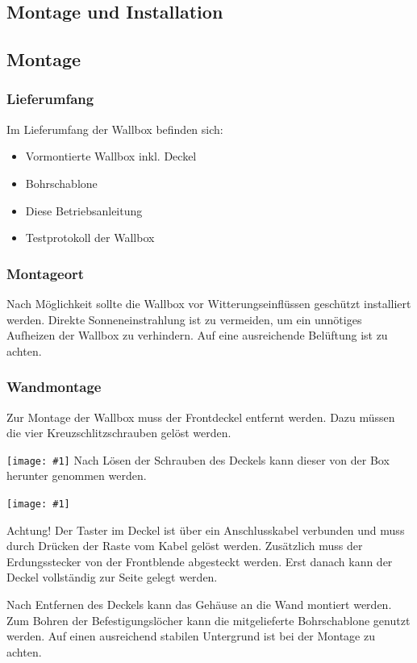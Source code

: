 \documentclass[a4paper,10pt]{article}
\newcommand{\gfx}[1]{\texttt{[image: \#1]}}
\begin{document}
\begin{multicols*}{2}
	\section{Montage und Installation}
	\subsection{Montage}
	\subsubsection{Lieferumfang}
	Im Lieferumfang der Wallbox befinden sich:
	\begin{itemize}
		\item Vormontierte Wallbox inkl. Deckel
		\item Bohrschablone
		\item Diese Betriebsanleitung
		\item Testprotokoll der Wallbox
	\end{itemize}

	\subsubsection{Montageort}
	Nach Möglichkeit sollte die Wallbox vor Witterungseinflüssen geschützt
	installiert werden. Direkte Sonneneinstrahlung ist zu vermeiden, um ein
	unnötiges Aufheizen der Wallbox zu verhindern. Auf eine ausreichende Belüftung
	ist zu achten.

	\subsubsection{Wandmontage}\label{wandmontage}
	Zur Montage der Wallbox muss der Frontdeckel entfernt werden. Dazu müssen die
	vier Kreuzschlitzschrauben gelöst werden.

	\gfx{./img/resized/warp_screw_points_ready}
	Nach Lösen der Schrauben des Deckels kann dieser von der Box herunter genommen
	werden.

	\gfx{./img/resized/warp_button_connect_arrow_ready}

	Achtung! Der Taster im Deckel ist über ein Anschlusskabel verbunden und muss
	durch Drücken der Raste vom Kabel gelöst werden.
	Zusätzlich muss der Erdungsstecker von der Frontblende abgesteckt werden. 
	Erst danach kann der Deckel vollständig zur Seite gelegt werden.

	Nach Entfernen des Deckels kann das Gehäuse an die Wand montiert werden. Zum
	Bohren der Befestigungslöcher kann die mitgelieferte Bohrschablone genutzt
	werden. Auf einen ausreichend stabilen Untergrund ist bei der Montage zu
	achten.


\end{multicols*}
\end{document}
